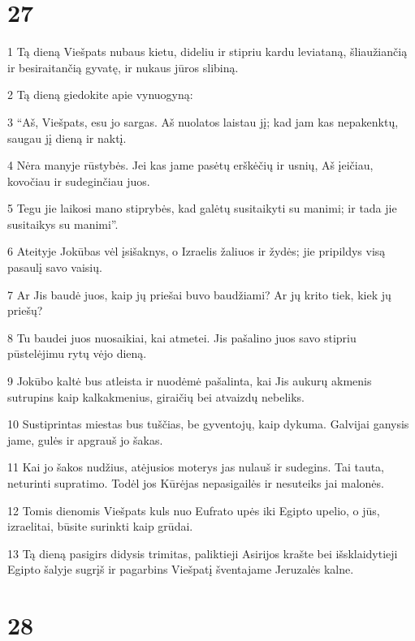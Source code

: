 \chapter{27}


\par 1 Tą dieną Viešpats nubaus kietu, dideliu ir stipriu kardu leviataną, šliaužiančią ir besiraitančią gyvatę, ir nukaus jūros slibiną. 
\par 2 Tą dieną giedokite apie vynuogyną: 
\par 3 “Aš, Viešpats, esu jo sargas. Aš nuolatos laistau jį; kad jam kas nepakenktų, saugau jį dieną ir naktį. 
\par 4 Nėra manyje rūstybės. Jei kas jame pasėtų erškėčių ir usnių, Aš įeičiau, kovočiau ir sudeginčiau juos. 
\par 5 Tegu jie laikosi mano stiprybės, kad galėtų susitaikyti su manimi; ir tada jie susitaikys su manimi”. 
\par 6 Ateityje Jokūbas vėl įsišaknys, o Izraelis žaliuos ir žydės; jie pripildys visą pasaulį savo vaisių. 
\par 7 Ar Jis baudė juos, kaip jų priešai buvo baudžiami? Ar jų krito tiek, kiek jų priešų? 
\par 8 Tu baudei juos nuosaikiai, kai atmetei. Jis pašalino juos savo stipriu pūstelėjimu rytų vėjo dieną. 
\par 9 Jokūbo kaltė bus atleista ir nuodėmė pašalinta, kai Jis aukurų akmenis sutrupins kaip kalkakmenius, giraičių bei atvaizdų nebeliks. 
\par 10 Sustiprintas miestas bus tuščias, be gyventojų, kaip dykuma. Galvijai ganysis jame, gulės ir apgrauš jo šakas. 
\par 11 Kai jo šakos nudžius, atėjusios moterys jas nulauš ir sudegins. Tai tauta, neturinti supratimo. Todėl jos Kūrėjas nepasigailės ir nesuteiks jai malonės. 
\par 12 Tomis dienomis Viešpats kuls nuo Eufrato upės iki Egipto upelio, o jūs, izraelitai, būsite surinkti kaip grūdai. 
\par 13 Tą dieną pasigirs didysis trimitas, paliktieji Asirijos krašte bei išsklaidytieji Egipto šalyje sugrįš ir pagarbins Viešpatį šventajame Jeruzalės kalne.



\chapter{28}


